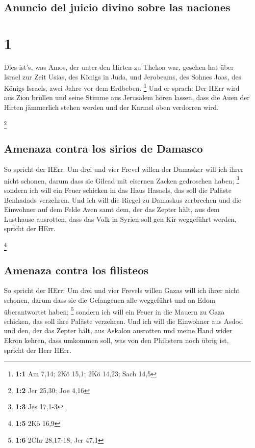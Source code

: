 \hypertarget{anuncio-del-juicio-divino-sobre-las-naciones}{%
\subsection{Anuncio del juicio divino sobre las
naciones}\label{anuncio-del-juicio-divino-sobre-las-naciones}}

\hypertarget{section}{%
\section{1}\label{section}}

 Dies ist's, was Amos, der unter den Hirten zu Thekoa war,
gesehen hat über Israel zur Zeit Usias, des Königs in Juda, und
Jerobeams, des Sohnes Joas, des Königs Israels, zwei Jahre vor dem
Erdbeben. \footnote{\textbf{1:1} Am 7,14; 2Kö 15,1; 2Kö 14,23; Sach 14,5}
 Und er sprach: Der HErr wird aus Zion brüllen und seine
Stimme aus Jerusalem hören lassen, dass die Auen der Hirten jämmerlich
stehen werden und der Karmel oben verdorren wird.

\footnote{\textbf{1:2} Jer 25,30; Joe 4,16}

\hypertarget{amenaza-contra-los-sirios-de-damasco}{%
\subsection{Amenaza contra los sirios de
Damasco}\label{amenaza-contra-los-sirios-de-damasco}}

 So spricht der HErr: Um drei und vier Frevel willen der
Damasker will ich ihrer nicht schonen, darum dass sie Gilead mit
eisernen Zacken gedroschen haben; \footnote{\textbf{1:3} Jes 17,1-3}
 sondern ich will ein Feuer schicken in das Haus Hasaels,
das soll die Paläste Benhadads verzehren.  Und ich will
die Riegel zu Damaskus zerbrechen und die Einwohner auf dem Felde Aven
samt dem, der das Zepter hält, aus dem Lusthause ausrotten, dass das
Volk in Syrien soll gen Kir weggeführt werden, spricht der HErr.

\footnote{\textbf{1:5} 2Kö 16,9}

\hypertarget{amenaza-contra-los-filisteos}{%
\subsection{Amenaza contra los
filisteos}\label{amenaza-contra-los-filisteos}}

 So spricht der HErr: Um drei und vier Frevels willen
Gazas will ich ihrer nicht schonen, darum dass sie die Gefangenen alle
weggeführt und an Edom überantwortet haben; \footnote{\textbf{1:6} 2Chr
  28,17-18; Jer 47,1}  sondern ich will ein Feuer in die
Mauern zu Gaza schicken, das soll ihre Paläste verzehren. 
Und ich will die Einwohner aus Asdod und den, der das Zepter hält, aus
Askalon ausrotten und meine Hand wider Ekron kehren, dass umkommen soll,
was von den Philistern noch übrig ist, spricht der Herr HErr.

